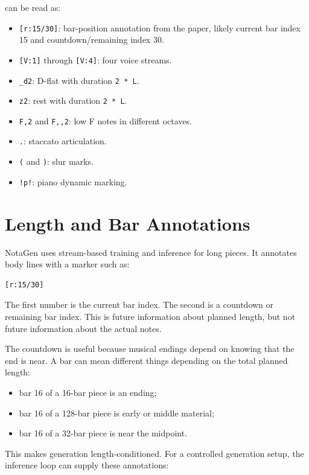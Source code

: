 \documentclass[11pt]{article}
\begin{document}
can be read as:

\begin{itemize}[leftmargin=*]
  \item \verb|[r:15/30]|: bar-position annotation from the paper, likely current
  bar index 15 and countdown/remaining index 30.
  \item \verb|[V:1]| through \verb|[V:4]|: four voice streams.
  \item \verb|_d2|: D-flat with duration \verb|2 * L|.
  \item \verb|z2|: rest with duration \verb|2 * L|.
  \item \verb|F,2| and \verb|F,,2|: low F notes in different octaves.
  \item \verb|.|: staccato articulation.
  \item \verb|(| and \verb|)|: slur marks.
  \item \verb|!p!|: piano dynamic marking.
\end{itemize}

\section{Length and Bar Annotations}
\label{sec:length}

NotaGen uses stream-based training and inference for long pieces. It annotates
body lines with a marker such as:

\begin{verbatim}
[r:15/30]
\end{verbatim}

The first number is the current bar index. The second is a countdown or remaining
bar index. This is future information about planned length, but not future
information about the actual notes.

The countdown is useful because musical endings depend on knowing that the end
is near. A bar can mean different things depending on the total planned length:

\begin{itemize}[leftmargin=*]
  \item bar 16 of a 16-bar piece is an ending;
  \item bar 16 of a 128-bar piece is early or middle material;
  \item bar 16 of a 32-bar piece is near the midpoint.
\end{itemize}

This makes generation length-conditioned. For a controlled generation setup, the
inference loop can supply these annotations:
\end{document}
